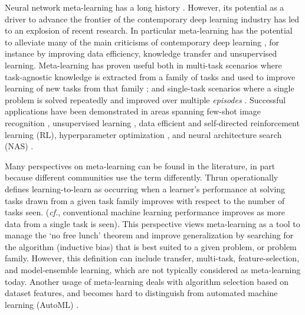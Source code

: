 \documentclass[10pt,journal,compsoc]{IEEEtran}
\begin{document}
Neural network meta-learning has a long history \cite{schmidhuber1987evolutionary,schmidhuber1997inductivebias,thrun1998learning}. However, its potential as a driver to advance the frontier of the contemporary deep learning industry has led to an explosion of recent research. In particular meta-learning has the potential to alleviate many of the main criticisms of contemporary deep learning \cite{marcus2018deepcritical}, for instance by improving data efficiency, knowledge transfer and unsupervised learning. Meta-learning has proven useful both in multi-task scenarios where task-agnostic knowledge is extracted from a family of tasks and used to improve learning of new tasks from that family \cite{finn2017maml,thrun1998learning}; and single-task scenarios where a single problem is solved repeatedly and improved over multiple \emph{episodes} \cite{franceschi2018bilevel,liu2019darts,andrychowicz2016graddescgraddesc}.
Successful applications have been demonstrated in areas spanning few-shot image recognition \cite{finn2017maml,snell2017prototypicalnets}, unsupervised learning \cite{metz2018meta}, data efficient \cite{duan2016fastslowrl,houthooft2018epg} and self-directed \cite{alet2020metacuriosity} reinforcement learning (RL), hyperparameter optimization \cite{franceschi2018bilevel}, and neural architecture search (NAS) \cite{liu2019darts, real2018regularized, zoph2016neural}.

Many perspectives on meta-learning can be found in the literature, in part because different communities use the term differently. 
{Thrun \cite{thrun1998learning} operationally defines learning-to-learn as occurring when a learner's performance at solving tasks drawn from a given task family improves with respect to the number of tasks seen. (\emph{cf.}, conventional machine learning performance improves as more data from a single task is seen).} This perspective \cite{vilalta2002perspective,thrun1998lifelong,baxter1998theoretical} views meta-learning as a tool to manage the `no free lunch' theorem \cite{wolpert1996nofreelunchlearning} and improve generalization by searching for the algorithm (inductive bias) that is best suited to a given problem, or problem family. However, this definition can include transfer, multi-task, feature-selection, and model-ensemble learning, which are not typically considered as meta-learning today. 
Another usage of meta-learning \cite{vanschoren2018metasurvey} deals with algorithm selection based on dataset features, and becomes hard to distinguish from automated machine learning (AutoML) \cite{yao2018automl,hutter2019autoMLbook}. 
\end{document}
